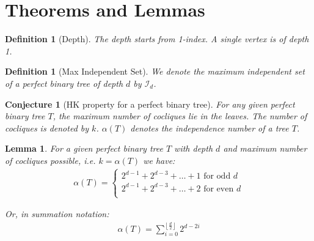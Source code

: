 \documentclass{article}
\newtheorem{lemma}[theorem]{Lemma}
\newtheorem{conjecture}[theorem]{Conjecture}
\newtheorem{definition}[theorem]{Definition}
\theoremstyle{definition}
\begin{document}
\section{Theorems and Lemmas}

\begin{definition}[Depth]
	The depth starts from 1-index. A single vertex is of depth 1.
\end{definition}

\begin{definition}[Max Independent Set]
	We denote the maximum independent set of a perfect binary tree of depth $d$ by $\mathcal{I}_d$.
\end{definition}

\begin{conjecture}[HK property for a perfect binary tree]
	For any given perfect binary tree $T$, the maximum number of cocliques lie in the leaves. The number of cocliques is denoted by $k$. $\alpha(T)$ denotes the independence number of a tree $T$.
\end{conjecture}

\begin{lemma}\label{independence_num}
	For a given perfect binary tree $T$ with depth $d$ and maximum number of cocliques possible, i.e. $k = \alpha(T)$ we have:
	\begin{align*}
		\alpha(T) = \begin{cases}
			            2^{d - 1} + 2^{d-3} + \ldots + 1 \text{ for odd $d$}  \\
			            2^{d - 1} + 2^{d-3} + \ldots + 2 \text{ for even $d$} \\
		            \end{cases}
	\end{align*}

	Or, in summation notation:
	\begin{align*}
		\alpha(T) = \sum_{i= 0}^{\left\lfloor\frac{d}{2}\right\rfloor} 2^{d - 2i}
	\end{align*}
\end{lemma}
\end{document}
